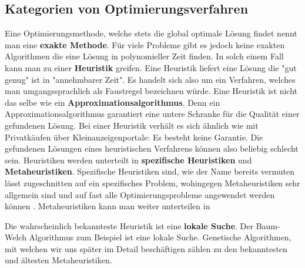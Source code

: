 \subsection{Kategorien von Optimierungsverfahren}
Eine Optimierungsmethode, welche stets die global optimale Lösung findet nennt man eine \textbf{exakte Methode}. Für viele Probleme gibt es jedoch keine exakten Algorithmen die eine Lösung in polynomieller Zeit finden. In solch einem Fall kann man zu einer \textbf{Heuristik} greifen. Eine Heuristik liefert eine Lösung die "gut genug" ist in "annehmbarer Zeit". Es handelt sich also um ein Verfahren, welches man umgangssprachlich als Faustregel bezeichnen würde. Eine Heuristik ist nicht das selbe wie ein \textbf{Approximationsalgorithmus}. Denn ein Approximationsalgorithmus garantiert eine untere Schranke für die Qualität einer gefundenen Lösung. Bei einer Heuristik verhält es sich ähnlich wie mit Privatkäufen über Kleinanzeigenportale: Es besteht keine Garantie. Die gefundenen Lösungen eines heuristischen Verfahrens können also beliebig schlecht sein. Heuristiken werden unterteilt in \textbf{spezifische Heuristiken} und \textbf{Metaheuristiken}. Spezifische Heuristiken sind, wie der Name bereits vermuten lässt zugeschnitten auf ein spezifisches Problem, wohingegen Metaheuristiken sehr allgemein sind und auf fast alle Optimierungsprobleme angewendet werden können \cite*{MetaheuristicsEGT}. Metaheuristiken kann man weiter unterteilen in 

Die wahrscheinlich bekannteste Heuristik ist eine \textbf{lokale Suche}. Der Baum-Welch Algorithmus zum Beispiel ist eine lokale Suche. Genetische Algorithmen, mit welchen wir uns später im Detail beschäftigen zählen zu den bekanntesten und ältesten Metaheuristiken.

